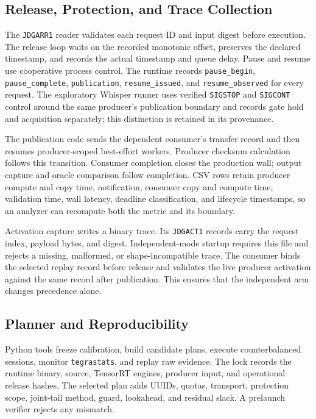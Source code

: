 \subsection{Release, Protection, and Trace Collection}

The \texttt{JDGARR1} reader validates each request ID and input digest before
execution.  The release loop waits on the recorded monotonic offset, preserves
the declared timestamp, and records the actual timestamp and queue delay.
Pause and resume use cooperative process control.  The runtime records
\texttt{pause\_begin}, \texttt{pause\_complete},
\texttt{publication}, \texttt{resume\_issued}, and
\texttt{resume\_observed} for every request.
The exploratory Whisper runner uses verified \texttt{SIGSTOP} and
\texttt{SIGCONT} control around the same producer's publication boundary and
records gate hold and acquisition separately; this distinction is retained in
its provenance.

The publication code sends the dependent consumer's transfer record and then
resumes producer-scoped best-effort workers.  Producer checksum calculation
follows this transition.  Consumer completion closes the production wall;
output capture and oracle comparison follow completion.  CSV rows retain
producer compute and copy time, notification, consumer copy and compute time,
validation time, wall latency, deadline classification, and lifecycle
timestamps, so an analyzer can recompute both the metric and its boundary.

Activation capture writes a binary trace.  Its \texttt{JDGACT1} records carry
the request index, payload bytes, and digest.  Independent-mode startup
requires this file and rejects a missing, malformed, or shape-incompatible
trace.  The consumer binds the selected replay record before release and
validates the live producer activation against the same record after
publication.  This ensures that the independent arm changes precedence alone.

\subsection{Planner and Reproducibility}

Python tools freeze calibration, build candidate plans, execute
counterbalanced sessions, monitor \texttt{tegrastats}, and replay raw evidence.
The lock records the runtime binary, source, TensorRT engines, producer input,
and operational release hashes.  The selected plan adds UUIDs, quotas,
transport, protection scope, joint-tail method, guard, lookahead, and residual
slack.  A prelaunch verifier rejects any mismatch.

